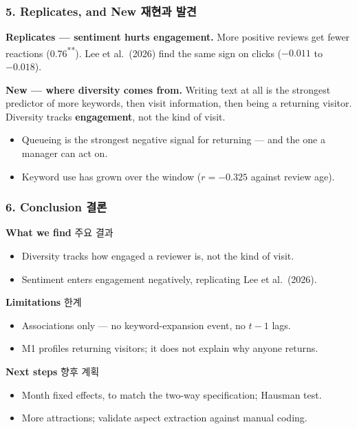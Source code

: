 \documentclass[compress]{beamer}
\newcommand{\ko}[1]{{\footnotesize\color{black!50}#1}}
\newcommand{\kosub}[1]{{\scriptsize\color{black!55}#1}}
\newcommand{\aside}[1]{%
  \begin{center}\colorbox{UBIblue!12}{%
    \parbox{\dimexpr\textwidth-14pt\relax}{\vspace{2pt}#1\vspace{2pt}}}\end{center}}
\begin{document}
\begin{frame}
\frametitle{5. Replicates, and New \ko{재현과 발견}}
\aside{\scriptsize
  {\color{UBIred}\textbf{Replicates — sentiment hurts engagement.}}
  More positive reviews get fewer reactions (0.76\textsuperscript{**}).
  Lee et al.\ (2026) find the same sign on clicks ($-0.011$ to $-0.018$).}
\aside{\scriptsize
  {\color{UBIred}\textbf{New — where diversity comes from.}}
  Writing text at all is the strongest predictor of more keywords, then visit
  information, then being a returning visitor. Diversity tracks
  \textbf{engagement}, not the kind of visit.}
{\scriptsize
\begin{itemize}\itemsep2pt
  \item Queueing is the strongest negative signal for returning — and the one a
        manager can act on.
  \item Keyword use has grown over the window ($r = -0.325$ against review age).
\end{itemize}}
\end{frame}

\begin{frame}
\frametitle{6. Conclusion \ko{결론}}
{\scriptsize
{\color{UBIred}\textbf{What we find}} \kosub{주요 결과}
\begin{itemize}\itemsep0pt
  \item Diversity tracks how engaged a reviewer is, not the kind of visit.
  \item Sentiment enters engagement negatively, replicating Lee et al.\ (2026).
\end{itemize}
\vspace{6pt}
{\color{UBIred}\textbf{Limitations}} \kosub{한계}
\begin{itemize}\itemsep0pt
  \item Associations only — no keyword-expansion event, no $t-1$ lags.
  \item M1 profiles returning visitors; it does not explain why anyone returns.
\end{itemize}
\vspace{6pt}
{\color{UBIred}\textbf{Next steps}} \kosub{향후 계획}
\begin{itemize}\itemsep0pt
  \item Month fixed effects, to match the two-way specification; Hausman test.
  \item More attractions; validate aspect extraction against manual coding.
\end{itemize}}
\end{frame}
\end{document}

